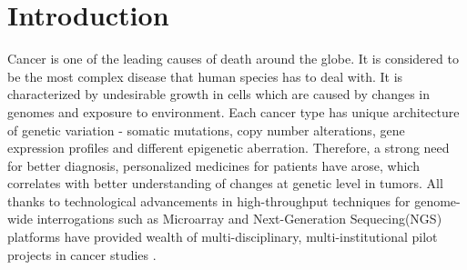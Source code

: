 %

\chapter{Introduction}
Cancer is one of the leading causes of death around the globe. It is considered to be the most complex disease that human species has to deal with. It is characterized by undesirable growth in cells which are caused by changes in genomes and exposure to environment\cite{5}. Each cancer type has unique architecture of genetic variation - somatic mutations, copy number alterations, gene expression profiles and different epigenetic aberration. Therefore, a strong need for better diagnosis, personalized medicines for patients have arose, which correlates with better understanding of changes at genetic level in tumors. All thanks to technological advancements in high-throughput techniques for genome-wide interrogations such as Microarray and Next-Generation Sequecing(NGS) platforms have provided wealth of multi-disciplinary, multi-institutional pilot projects in cancer studies\cite{stratton2009cancer} \cite{lengauer1998genetic}.\\~\\
